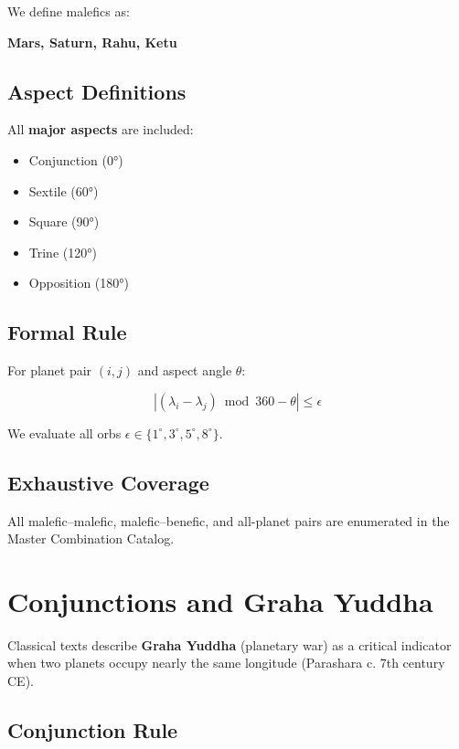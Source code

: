 \documentclass[
  11pt,
  a4paper,
  oneside,
  openany]{report}
\providecommand{\tightlist}{%
  \setlength{\itemsep}{0pt}\setlength{\parskip}{0pt}}\usepackage{longtable,booktabs,array}
\begin{document}
We define malefics as:

\textbf{Mars, Saturn, Rahu, Ketu}

\section{Aspect Definitions}\label{aspect-definitions}

All \textbf{major aspects} are included:

\begin{itemize}
\tightlist
\item
  Conjunction (0°)
\item
  Sextile (60°)
\item
  Square (90°)
\item
  Trine (120°)
\item
  Opposition (180°)
\end{itemize}

\section{Formal Rule}\label{formal-rule}

For planet pair \((i,j)\) and aspect angle \(\theta\):

\[
|(\lambda_i - \lambda_j) \bmod 360 - \theta| \leq \epsilon
\]

We evaluate all orbs
\(\epsilon \in \{1^\circ, 3^\circ, 5^\circ, 8^\circ\}\).

\section{Exhaustive Coverage}\label{exhaustive-coverage}

All malefic--malefic, malefic--benefic, and all-planet pairs are
enumerated in the Master Combination Catalog.

\chapter{Conjunctions and Graha
Yuddha}\label{conjunctions-and-graha-yuddha}

Classical texts describe \textbf{Graha Yuddha} (planetary war) as a
critical indicator when two planets occupy nearly the same longitude
(Parashara c. 7th century CE).

\section{Conjunction Rule}\label{conjunction-rule}
\end{document}
